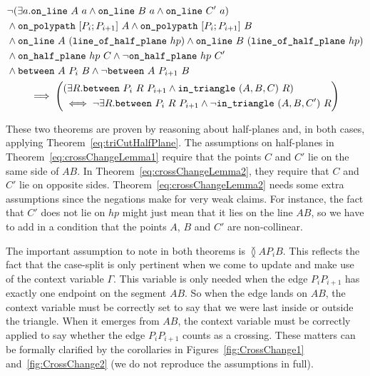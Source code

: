 \begin{multline}\label{eq:crossChangeLemma2}
  \begin{split}
    &\neg(\exists a.\texttt{on\_line}\ A\ a\wedge \texttt{on\_line}\ B\ a\wedge \texttt{on\_line}\ C'\ a)\\
    &\wedge \texttt{on\_polypath}\ [P_i;P_{i+1}]\ A \wedge \texttt{on\_polypath}\ [P_i;P_{i+1}]\ B\\
    &\wedge\texttt{on\_line}\ A\ (\texttt{line\_of\_half\_plane}\ hp) \wedge \texttt{on\_line}\ B\ (\texttt{line\_of\_half\_plane}\ hp)\\
    &\wedge\texttt{on\_half\_plane}\ hp\ C \wedge \neg\texttt{on\_half\_plane}\ hp\ C'\\
    &\wedge \texttt{between}\ A\ P_i\ B \wedge \neg\texttt{between}\ A\ P_{i+1}\ B
  \end{split}\\
  \implies\left(\begin{split}
      &(\exists R. \texttt{between}\ P_i\ R\ P_{i+1} \wedge \texttt{in\_triangle}\ (A,B,C)\ R)\\
      &\iff\neg \exists R. \texttt{between}\ P_i\ R\ P_{i+1} \wedge \neg\texttt{in\_triangle}\ (A,B,C')\ R
  \end{split}\right)
\end{multline}

These two theorems are proven by reasoning about half-planes and, in both cases, applying Theorem~\ref{eq:triCutHalfPlane}. The assumptions on half-planes in Theorem~\ref{eq:crossChangeLemma1} require that the points $C$ and $C'$ lie on the same side of $AB$. In Theorem~\ref{eq:crossChangeLemma2}, they require that $C$ and $C'$ lie on opposite sides. Theorem~\ref{eq:crossChangeLemma2} needs some extra assumptions since the negations make for very weak claims. For instance, the fact that $C'$ does not lie on $hp$ might just mean that it lies on the line $AB$, so we have to add in a condition that the points $A$, $B$ and $C'$ are non-collinear.

The important assumption to note in both theorems is $\between{A}{P_i}{B}$. This reflects the fact that the case-split is only pertinent when we come to update and make use of the context variable $\Gamma$. This variable is only needed when the edge $P_iP_{i+1}$ has exactly one endpoint on the segment $AB$. So when the edge lands on $AB$, the context variable must be correctly set to say that we were last inside or outside the triangle. When it emerges from $AB$, the context variable must be correctly applied to say whether the edge $P_iP_{i+1}$ counts as a crossing. These matters can be formally clarified by the corollaries in Figures~\ref{fig:CrossChange1} and~\ref{fig:CrossChange2} (we do not reproduce the assumptions in full).

